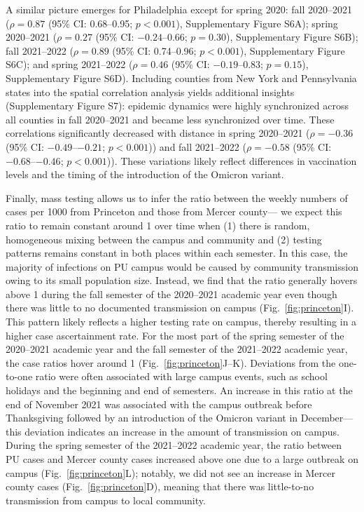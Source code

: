 \documentclass[12pt]{article}
\newcommand{\fref}[1]{Fig.~\ref{fig:#1}}
\begin{document}
A similar picture emerges for Philadelphia except for spring 2020: fall 2020--2021 ($\rho = 0.87$ (95\% CI: 0.68--0.95; $p < 0.001$), Supplementary Figure S6A); spring 2020--2021 ($\rho = 0.27$ (95\% CI: $-0.24$--0.66; $p = 0.30$), Supplementary Figure S6B); fall 2021--2022 ($\rho = 0.89$ (95\% CI: 0.74--0.96; $p < 0.001$), Supplementary Figure S6C); 
and spring 2021--2022 ($\rho=0.46$ (95\% CI: $-0.19$--0.83; $p=0.15$), Supplementary Figure S6D).
Including counties from New York and Pennsylvania states into the spatial correlation analysis yields additional insights (Supplementary Figure S7):
epidemic dynamics were highly synchronized across all counties in fall 2020--2021 and became less synchronized over time. 
These correlations significantly decreased with distance in spring 2020--2021 ($\rho = -0.36$ (95\% CI: $-0.49$--$-0.21$; $p < 0.001$)) and fall 2021--2022 ($\rho = -0.58$ (95\% CI: $-0.68$--$-0.46$; $p < 0.001$)).
These variations likely reflect differences in vaccination levels and the timing of the introduction of the Omicron variant.

Finally, mass testing allows us to infer the ratio between the weekly numbers of cases per 1000 from Princeton and those from Mercer county---
we expect this ratio to remain constant around 1 over time when (1) there is random, homogeneous mixing between the campus and community and (2) testing patterns remains constant in both places within each semester. 
In this case, the majority of infections on PU campus would be caused by community transmission owing to its small population size.
Instead, we find that the ratio generally hovers above 1 during the fall semester of the 2020--2021 academic year even though there was little to no documented transmission on campus (\fref{princeton}I).
This pattern likely reflects a higher testing rate on campus, thereby resulting in a higher case ascertainment rate.
For the most part of the spring semester of the 2020--2021 academic year and the fall semester of the 2021--2022 academic year, the case ratios hover around 1 (\fref{princeton}J--K).
Deviations from the one-to-one ratio were often associated with large campus events, such as school holidays and the beginning and end of semesters.
An increase in this ratio at the end of November 2021 was associated with the campus outbreak before Thanksgiving followed by an introduction of the Omicron variant in December---this deviation indicates an increase in the amount of transmission on campus.
During the spring semester of the 2021--2022 academic year, the ratio between PU cases and Mercer county cases increased above one due to a large outbreak on campus (\fref{princeton}L);
notably, we did not see an increase in Mercer county cases (\fref{princeton}D), meaning that there was little-to-no transmission from campus to local community.
\end{document}
